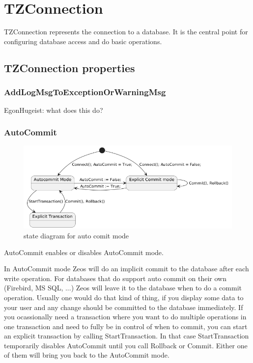 \documentclass[a4paper,12pt,oneside]{book}
\begin{document}
\section{TZConnection}
TZConnection represents the connection to a database.
It is the central point for configuring database access and do basic operations.

\subsection{TZConnection properties}

\subsubsection{AddLogMsgToExceptionOrWarningMsg}
EgonHugeist: what does this do?

\FloatBarrier
\subsubsection{AutoCommit}

\begin{figure}
	\includegraphics[width=\linewidth]{Reference/autocommit.png}
	\caption{state diagram for auto comit mode}
	\label{fig:autocommit}
\end{figure}

AutoCommit enables or disables AutoCommit mode.

In AutoCommit mode Zeos will do an implicit commit to the database after each write operation.
For databases that do support auto commit on their own (Firebird, MS SQL, ...) Zeos will leave it to the database when to do a commit operation.
Usually one would do that kind of thing, if you display some data to your user and any change should be committed to the database immediately.
If you ocassionally need a transaction where you want to do multiple operations in one transaction and need to fully be in control of when to commit, you can start an explicit transaction by calling StartTransaction.
In that case StartTransaction temporarily disables AutoCommit until you call Rollback or Commit. Either one of them will bring you back to the AutoCommit mode.
\end{document}
